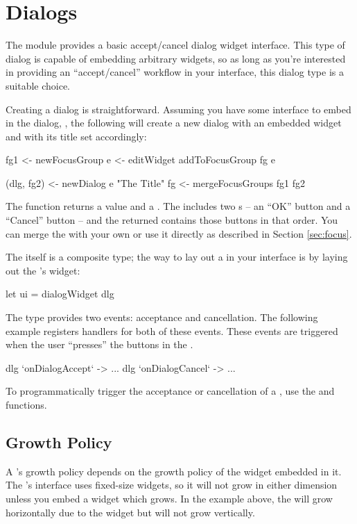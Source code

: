 \section{Dialogs}

The  module provides a basic accept/cancel dialog widget
interface.  This type of dialog is capable of embedding arbitrary
widgets, so as long as you're interested in providing an
``accept/cancel'' workflow in your interface, this dialog type is a
suitable choice.

Creating a dialog is straightforward.  Assuming you have some
interface to embed in the dialog, , the following will create a
new dialog with an embedded  widget and with its title set
accordingly:

\begin{haskellcode}
 fg1 <- newFocusGroup
 e <- editWidget
 addToFocusGroup fg e

 (dlg, fg2) <- newDialog e "The Title"
 fg <- mergeFocusGroups fg1 fg2
\end{haskellcode}

The  function returns a  value and a
.  The  includes two s -- an
``OK'' button and a ``Cancel'' button -- and the returned
 contains those buttons in that order.  You can merge
the  with your own or use it directly as described in
Section \ref{sec:focus}.

The  itself is a composite type; the way to lay out a
 in your interface is by laying out the 's
widget:

\begin{haskellcode}
 let ui = dialogWidget dlg
\end{haskellcode}

The  type provides two events: acceptance and cancellation.
The following example registers handlers for both of these events.
These events are triggered when the user ``presses'' the buttons in
the .

\begin{haskellcode}
 dlg `onDialogAccept` \this ->
   ...
 dlg `onDialogCancel` \this ->
   ...
\end{haskellcode}

To programmatically trigger the acceptance or cancellation of a
, use the  and 
functions.

\subsection{Growth Policy}

A 's growth policy depends on the growth policy of the
widget embedded in it.  The 's interface uses fixed-size
widgets, so it will not grow in either dimension unless you embed a
widget which grows.  In the example above, the  will grow
horizontally due to the  widget but will not grow vertically.
